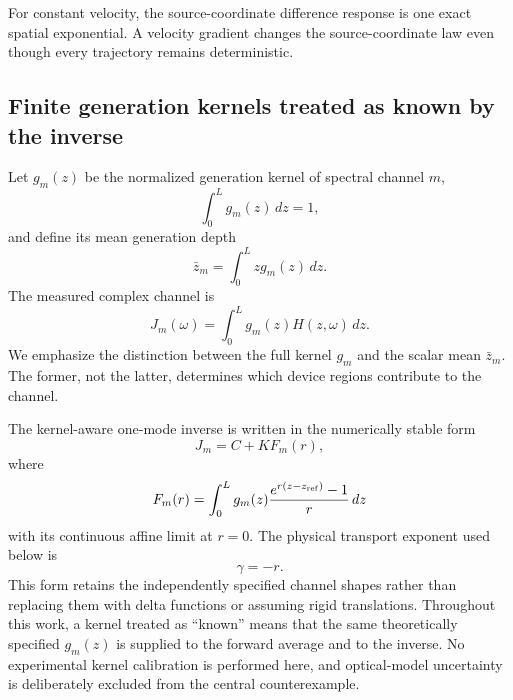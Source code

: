 \documentclass[aps,pra,twocolumn,superscriptaddress,nofootinbib]{revtex4-2}
\begin{document}
For constant velocity, the source-coordinate difference response is one exact spatial exponential. A velocity gradient changes the source-coordinate law even though every trajectory remains deterministic.

\subsection{Finite generation kernels treated as known by the inverse}

Let $g_m(z)$ be the normalized generation kernel of spectral channel $m$,
\begin{equation}
\int_0^L g_m(z)\,dz=1,
\end{equation}
and define its mean generation depth
\begin{equation}
\bar z_m=\int_0^L z g_m(z)\,dz.
\end{equation}
The measured complex channel is
\begin{equation}
\boxed{
J_m(\omega)=\int_0^L g_m(z)H(z,\omega)\,dz.
}
\label{eq:channel}
\end{equation}
We emphasize the distinction between the full kernel $g_m$ and the scalar mean $\bar z_m$. The former, not the latter, determines which device regions contribute to the channel.

The kernel-aware one-mode inverse is written in the numerically stable form
\begin{equation}
J_m=C+K F_m(r),
\label{eq:onemode}
\end{equation}
where
\begin{equation}
F_m(r)=\int_0^L g_m(z)
\frac{e^{r(z-z_{\rm ref})}-1}{r}\,dz
\end{equation}
with its continuous affine limit at $r=0$. The physical transport exponent used below is
\begin{equation}
\gamma=-r.
\end{equation}
This form retains the independently specified channel shapes rather than replacing them with delta functions or assuming rigid translations.  Throughout this work, a kernel treated as ``known'' means that the same theoretically specified $g_m(z)$ is supplied to the forward average and to the inverse.  No experimental kernel calibration is performed here, and optical-model uncertainty is deliberately excluded from the central counterexample.
\end{document}
